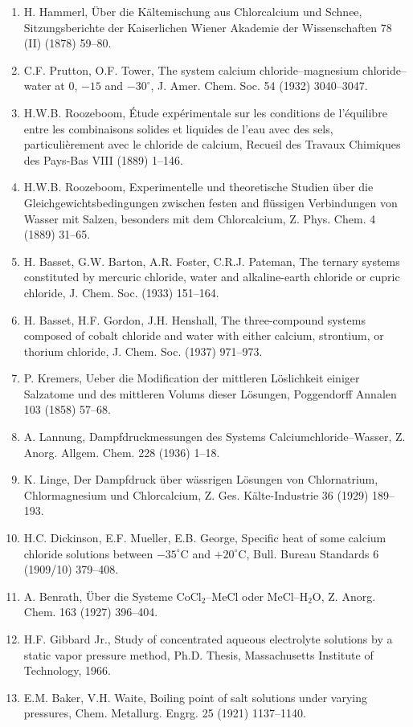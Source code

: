 \documentclass[11pt]{article}
\begin{document}
\begin{enumerate}
\item H. Hammerl, \"Uber die K\"altemischung aus Chlorcalcium und Schnee, Sitzungsberichte der Kaiserlichen Wiener Akademie der Wissenschaften 78 (II) (1878) 59--80.
\item C.F. Prutton, O.F. Tower, The system calcium chloride--magnesium chloride--water at 0, $-15$ and $-30^\circ$, J. Amer. Chem. Soc. 54 (1932) 3040--3047.
\item H.W.B. Roozeboom, \'Etude exp\'erimentale sur les conditions de l'\'equilibre entre les combinaisons solides et liquides de l'eau avec des sels, particuli\`erement avec le chloride de calcium, Recueil des Travaux Chimiques des Pays-Bas VIII (1889) 1--146.
\item H.W.B. Roozeboom, Experimentelle und theoretische Studien \"uber die Gleichgewichtsbedingungen zwischen festen and fl\"ussigen Verbindungen von Wasser mit Salzen, besonders mit dem Chlorcalcium, Z. Phys. Chem. 4 (1889) 31--65.
\item H. Basset, G.W. Barton, A.R. Foster, C.R.J. Pateman, The ternary systems constituted by mercuric chloride, water and alkaline-earth chloride or cupric chloride, J. Chem. Soc. (1933) 151--164.
\item H. Basset, H.F. Gordon, J.H. Henshall, The three-compound systems composed of cobalt chloride and water with either calcium, strontium, or thorium chloride, J. Chem. Soc. (1937) 971--973.
\item P. Kremers, Ueber die Modification der mittleren L\"oslichkeit einiger Salzatome und des mittleren Volums dieser L\"osungen, Poggendorff Annalen 103 (1858) 57--68.
\item A. Lannung, Dampfdruckmessungen des Systems Calciumchloride--Wasser, Z. Anorg. Allgem. Chem. 228 (1936) 1--18.
\item K. Linge, Der Dampfdruck \"uber w\"assrigen L\"osungen von Chlornatrium, Chlormagnesium und Chlorcalcium, Z. Ges. K\"alte-Industrie 36 (1929) 189--193.
\item H.C. Dickinson, E.F. Mueller, E.B. George, Specific heat of some calcium chloride solutions between $-35^\circ$C and $+20^\circ$C, Bull. Bureau Standards 6 (1909/10) 379--408.
\item A. Benrath, \"Uber die Systeme CoCl$_2$--MeCl oder MeCl--H$_2$O, Z. Anorg. Chem. 163 (1927) 396--404.
\item H.F. Gibbard Jr., Study of concentrated aqueous electrolyte solutions by a static vapor pressure method, Ph.D. Thesis, Massachusetts Institute of Technology, 1966.
\item E.M. Baker, V.H. Waite, Boiling point of salt solutions under varying pressures, Chem. Metallurg. Engrg. 25 (1921) 1137--1140.

\end{enumerate}
\end{document}
